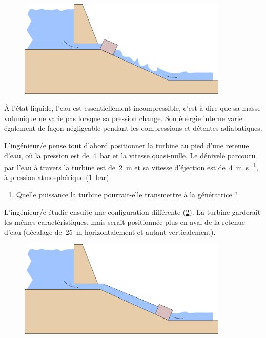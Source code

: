 	\begin{figure}
		\begin{center}
			\includegraphics[width=10cm]{images/water_turbine_1.png}
		\end{center}
		\label{fig_water_turbine_1}
	\end{figure}
	
	À l’état liquide, l’eau est essentiellement incompressible, c’est-à-dire que sa masse volumique ne varie pas lorsque sa pression change. Son énergie interne varie également de façon négligeable pendant les compressions et détentes adiabatiques.
	
	L’ingénieur/e pense tout d’abord positionner la turbine au pied d’une retenue d’eau, où la pression est de~\SI{4}{\bar} et la vitesse quasi-nulle. Le dénivelé parcouru par l’eau à travers la turbine est de~\SI{2}{\metre} et sa vitesse d’éjection est de~\SI{4}{\metre\per\second}, à pression atmosphérique (\SI{1}{\bar}).
	
	\begin{enumerate}
		\item Quelle puissance la turbine pourrait-elle transmettre à la génératrice ?
	\end{enumerate}

	L’ingénieur/e étudie ensuite une configuration différente (\cref{fig_water_turbine_2}). La turbine garderait les mêmes caractéristiques, mais serait positionnée plus en aval de la retenue d’eau (décalage de~\SI{25}{\metre} horizontalement et autant verticalement).
	
	\begin{figure}
		\begin{center}
			\includegraphics[width=10cm]{images/water_turbine_2.png}
		\end{center}
		\label{fig_water_turbine_2}
	\end{figure}

